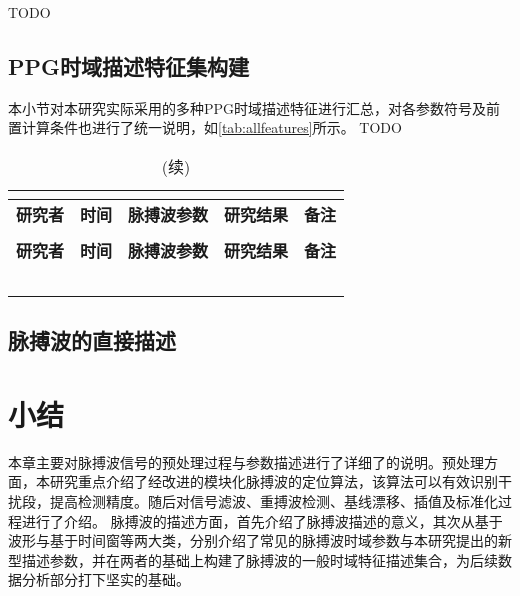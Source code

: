 TODO

\subsection{PPG时域描述特征集构建}
本小节对本研究实际采用的多种PPG时域描述特征进行汇总，对各参数符号及前置计算条件也进行了统一说明，如\autoref{tab:allfeatures}所示。
TODO
\begin{center}
    \fontsize{10}{4}
	\begin{longtable}{p{3cm}<{\centering}p{1cm}<{\centering}p{2cm}<{\centering}p{6cm}<{\centering}p{1cm}<{\centering}}
		\caption{本研究使用的所有PPG时域指标一览}\\
		\label{tab:allfeatures}\\
		\hline\hline
            \textbf{研究者}&\textbf{时间}&\textbf{脉搏波参数}&\textbf{研究结果}&\textbf{备注}\\
        \hline
        \endfirsthead
        \caption[]{(续)}\\
        \hline
            \textbf{研究者}&\textbf{时间}&\textbf{脉搏波参数}&\textbf{研究结果}&\textbf{备注}\\
        \hline
        \endhead 
        \hline
        \endfoot
        \hline\hline
        \endlastfoot
        &       &       &       &  \\
        &       &       &       &  \\
        &       &       &       &  \\
        &       &       &       &  \\
        &       &       &       &  \\
	\end{longtable}
\end{center}
\subsection{脉搏波的直接描述}
\section{小结}
本章主要对脉搏波信号的预处理过程与参数描述进行了详细了的说明。预处理方面，本研究重点介绍了经改进的模块化脉搏波的定位算法，该算法可以有效识别干扰段，提高检测精度。随后对信号滤波、重搏波检测、基线漂移、插值及标准化过程进行了介绍。
脉搏波的描述方面，首先介绍了脉搏波描述的意义，其次从基于波形与基于时间窗等两大类，分别介绍了常见的脉搏波时域参数与本研究提出的新型描述参数，并在两者的基础上构建了脉搏波的一般时域特征描述集合，为后续数据分析部分打下坚实的基础。